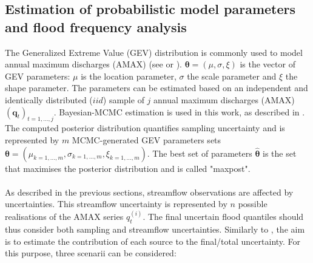 \documentclass[11pt]{article}
\begin{document}
    \subsection{Estimation of probabilistic model parameters and flood frequency analysis}
    \label{sec:STOODS}
    
    The Generalized Extreme Value (GEV) distribution is commonly used to model annual maximum discharges (AMAX) (see \citet{hamed_flood_2019} or \citet{jain_design_2019}). $\boldsymbol{\theta} = (\mu,\sigma,\xi)$ is the vector of GEV parameters: $\mu$ is the location parameter, $\sigma$ the scale parameter and $\xi$ the shape parameter. The parameters can be estimated based on an independent and identically distributed ($iid$) sample of $j$ annual maximum discharges (AMAX) $(\mathbf{q}_t)_{t=1,...,j}$. Bayesian-MCMC estimation is used in this work, as described in \citet{renard_application_2006}. The computed posterior distribution quantifies sampling uncertainty and is represented by $m$ MCMC-generated GEV parameters sets $\boldsymbol{\theta} = (\mu_{k=1,...,m},\sigma_{k=1,...,m},\xi_{k=1,...,m})$. The best set of parameters $\boldsymbol{\hat{\theta}}$ is the set that maximises the posterior distribution and is called "maxpost". 
    
    \paragraph{}
    As described in the previous sections, streamflow observations are affected by uncertainties. This streamflow uncertainty is represented by $n$ possible realisations of the AMAX series $q_t^{(i)}$. The final uncertain flood quantiles should thus consider both sampling and streamflow uncertainties. Similarly to \citet{steinbakk_propagation_2016}, the aim is to estimate the contribution of each source to the final/total uncertainty. For this purpose, three scenarii can be considered:
    
\end{document}
